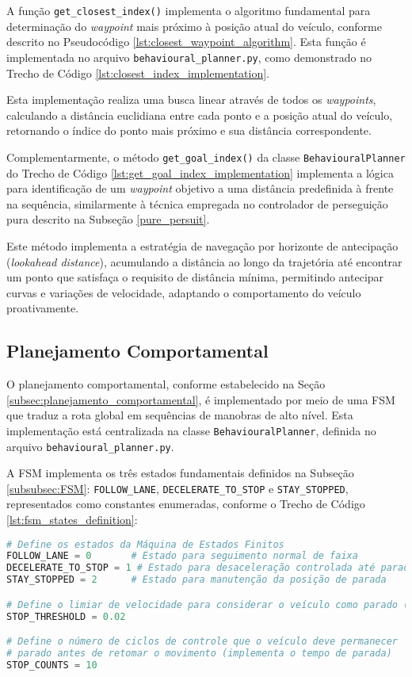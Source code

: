 A função \texttt{get\_closest\_index()} implementa o algoritmo fundamental para determinação do \textit{waypoint} mais próximo à posição atual do veículo, conforme descrito no Pseudocódigo \ref{lst:closest_waypoint_algorithm}. Esta função é implementada no arquivo \texttt{behavioural\_planner.py}, como demonstrado no Trecho de Código \ref{lst:closest_index_implementation}.

Esta implementação realiza uma busca linear através de todos os \textit{waypoints}, calculando a distância euclidiana entre cada ponto e a posição atual do veículo, retornando o índice do ponto mais próximo e sua distância correspondente.

Complementarmente, o método \texttt{get\_goal\_index()} da classe \texttt{BehaviouralPlanner} do Trecho de Código \ref{lst:get_goal_index_implementation} implementa a lógica para identificação de um \textit{waypoint} objetivo a uma distância predefinida à frente na sequência, similarmente à técnica empregada no controlador de perseguição pura descrito na Subseção \ref{pure_persuit}.

Este método implementa a estratégia de navegação por horizonte de antecipação (\textit{lookahead distance}), acumulando a distância ao longo da trajetória até encontrar um ponto que satisfaça o requisito de distância mínima, permitindo antecipar curvas e variações de velocidade, adaptando o comportamento do veículo proativamente.

\subsection{Planejamento Comportamental} \label{subsec:implementacao_comportamental}

O planejamento comportamental, conforme estabelecido na Seção \ref{subsec:planejamento_comportamental}, é implementado por meio de uma FSM que traduz a rota global em sequências de manobras de alto nível. Esta implementação está centralizada na classe \texttt{BehaviouralPlanner}, definida no arquivo \texttt{behavioural\_planner.py}.

A FSM implementa os três estados fundamentais definidos na Subseção \ref{subsubsec:FSM}: \texttt{FOLLOW\_LANE}, \texttt{DECELERATE\_TO\_STOP} e \texttt{STAY\_STOPPED}, representados como constantes enumeradas, conforme o Trecho de Código \ref{lst:fsm_states_definition}:

\begin{lstlisting}[language=Python, caption=Definição dos estados da FSM., label=lst:fsm_states_definition]
# Define os estados da Máquina de Estados Finitos
FOLLOW_LANE = 0       # Estado para seguimento normal de faixa
DECELERATE_TO_STOP = 1 # Estado para desaceleração controlada até parada
STAY_STOPPED = 2      # Estado para manutenção da posição de parada

# Define o limiar de velocidade para considerar o veículo como parado (m/s)
STOP_THRESHOLD = 0.02

# Define o número de ciclos de controle que o veículo deve permanecer
# parado antes de retomar o movimento (implementa o tempo de parada)
STOP_COUNTS = 10
\end{lstlisting}

